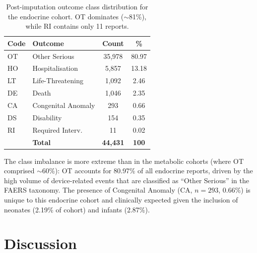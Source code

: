 \documentclass[10pt,twocolumn]{article}
\begin{document}
\begin{table}[!t]
\caption{Post-imputation outcome class distribution for the endocrine cohort. OT dominates ($\sim$81\%), while RI contains only 11 reports.}
\label{tab:class_dist}
\centering\small\setlength{\tabcolsep}{4pt}
\begin{tabularx}{\columnwidth}{|l|X|c|c|}
\hline
\rowcolor{tableHead}
\color{white}\textbf{Code} &
\color{white}\textbf{Outcome} &
\color{white}\textbf{Count} &
\color{white}\textbf{\%}\\
\hline
\rowcolor{rowA} OT & Other Serious & 35,978 & 80.97\\
\hline
\rowcolor{rowB} HO & Hospitalisation & 5,857 & 13.18\\
\hline
\rowcolor{rowA} LT & Life-Threatening & 1,092 & 2.46\\
\hline
\rowcolor{rowB} DE & Death & 1,046 & 2.35\\
\hline
\rowcolor{rowA} CA & Congenital Anomaly & 293 & 0.66\\
\hline
\rowcolor{rowB} DS & Disability & 154 & 0.35\\
\hline
\rowcolor{rowA} RI & Required Interv. & 11 & 0.02\\
\hline
\rowcolor{jpbiLight}
& \textbf{Total} & \textbf{44,431} & \textbf{100}\\
\hline
\end{tabularx}
\end{table}
 
The class imbalance is more extreme than in the metabolic cohorts (where OT comprised $\sim$60\%): OT accounts for 80.97\% of all endocrine reports, driven by the high volume of device-related events that are classified as ``Other Serious'' in the FAERS taxonomy. The presence of Congenital Anomaly (CA, $n = 293$, 0.66\%) is unique to this endocrine cohort and clinically expected given the inclusion of neonates (2.19\% of cohort) and infants (2.87\%).
 
\section{Discussion}
 
\end{document}

